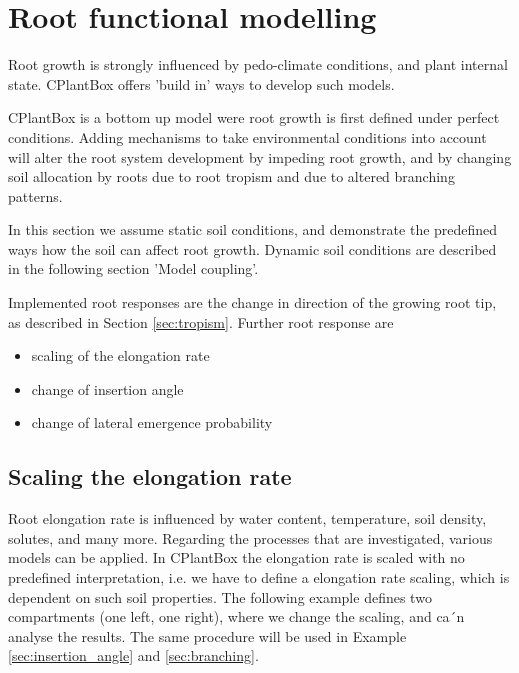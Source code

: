 \newpage
\section{Root functional modelling} \label{sec:functional}

Root growth is strongly influenced by pedo-climate conditions, and plant internal state. CPlantBox offers 'build in' ways to develop such models. 

CPlantBox is a bottom up model were root growth is first defined under perfect conditions. Adding mechanisms to take environmental conditions into account will alter the root system development by impeding root growth, and by changing soil allocation by roots due to root tropism and due to altered branching patterns.

In this section we assume static soil conditions, and demonstrate the predefined ways how the soil can affect root growth.
Dynamic soil conditions are described in the following section 'Model coupling'. 

Implemented root responses are the change in direction of the growing root tip, as described in Section \ref{sec:tropism}.
Further root response are 
\begin{itemize}
 \item scaling of the elongation rate 
 \item change of insertion angle
 \item change of lateral emergence probability
\end{itemize}

\subsection{Scaling the elongation rate} \label{sec:elongation}

Root elongation rate is influenced by water content, temperature, soil density, solutes, and many more. Regarding the processes that are investigated, various models can be applied. In CPlantBox the elongation rate is scaled with no predefined interpretation, i.e. we have to define a elongation rate scaling, which is dependent on such soil properties. The following example defines two compartments (one left, one right), where we change the scaling, and ca´n analyse the results. The same procedure will be used in Example \ref{sec:insertion_angle} and \ref{sec:branching}.



